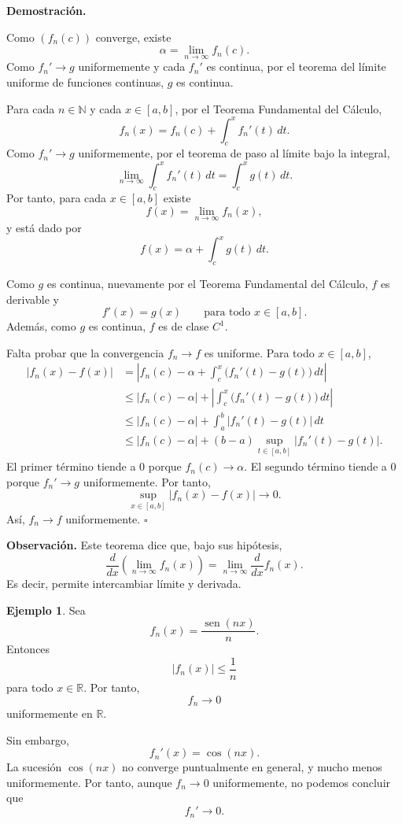 \documentclass[11pt,a4paper,openany]{book}
\theoremstyle{definition}
\newtheorem{ejemplo}{Ejemplo}[chapter]
\theoremstyle{plain}
\theoremstyle{remark}
\renewenvironment{proof}[1][\textbf{Demostración.}]{%
  \par\noindent #1\ \normalfont
}{\hfill$\square$\par\medskip}
\newenvironment{observacion}
{\par\medskip\noindent\textbf{Observación. }\normalfont}
{\par\medskip}
\newcommand{\R}{\mathbb{R}}
\newcommand{\N}{\mathbb{N}}
\DeclareMathOperator{\sen}{sen}
\begin{document}
\begin{proof}
Como $(f_n(c))$ converge, existe
\[
    \alpha=\lim_{n\to\infty} f_n(c).
\]
Como $f_n'\to g$ uniformemente y cada $f_n'$ es continua, por el teorema del
límite uniforme de funciones continuas, $g$ es continua.

Para cada $n\in\N$ y cada $x\in[a,b]$, por el Teorema Fundamental del Cálculo,
\[
    f_n(x)
    =
    f_n(c)
    +
    \int_c^x f_n'(t)\,dt.
\]
Como $f_n'\to g$ uniformemente, por el teorema de paso al límite bajo la
integral,
\[
    \lim_{n\to\infty}\int_c^x f_n'(t)\,dt
    =
    \int_c^x g(t)\,dt.
\]
Por tanto, para cada $x\in[a,b]$ existe
\[
    f(x)=\lim_{n\to\infty}f_n(x),
\]
y está dado por
\[
    f(x)
    =
    \alpha
    +
    \int_c^x g(t)\,dt.
\]

Como $g$ es continua, nuevamente por el Teorema Fundamental del Cálculo,
$f$ es derivable y
\[
    f'(x)=g(x)
    \qquad\text{para todo }x\in[a,b].
\]
Además, como $g$ es continua, $f$ es de clase $C^1$.

Falta probar que la convergencia $f_n\to f$ es uniforme. Para todo
$x\in[a,b]$,
\[
\begin{aligned}
    |f_n(x)-f(x)|
    &=
    \left|
    f_n(c)-\alpha
    +
    \int_c^x \bigl(f_n'(t)-g(t)\bigr)\,dt
    \right|\\
    &\leq
    |f_n(c)-\alpha|
    +
    \left|
    \int_c^x \bigl(f_n'(t)-g(t)\bigr)\,dt
    \right|\\
    &\leq
    |f_n(c)-\alpha|
    +
    \int_a^b |f_n'(t)-g(t)|\,dt\\
    &\leq
    |f_n(c)-\alpha|
    +
    (b-a)\sup_{t\in[a,b]}|f_n'(t)-g(t)|.
\end{aligned}
\]
El primer término tiende a $0$ porque $f_n(c)\to\alpha$. El segundo término
tiende a $0$ porque $f_n'\to g$ uniformemente. Por tanto,
\[
    \sup_{x\in[a,b]}|f_n(x)-f(x)|\to 0.
\]
Así, $f_n\to f$ uniformemente.
\end{proof}

\begin{observacion}
Este teorema dice que, bajo sus hipótesis,
\[
    \frac{d}{dx}\left(\lim_{n\to\infty}f_n(x)\right)
    =
    \lim_{n\to\infty}\frac{d}{dx}f_n(x).
\]
Es decir, permite intercambiar límite y derivada.
\end{observacion}

\begin{ejemplo}
Sea
\[
    f_n(x)=\frac{\sen(nx)}{n}.
\]
Entonces
\[
    |f_n(x)|\leq \frac1n
\]
para todo $x\in\R$. Por tanto,
\[
    f_n\to 0
\]
uniformemente en $\R$.

Sin embargo,
\[
    f_n'(x)=\cos(nx).
\]
La sucesión $\cos(nx)$ no converge puntualmente en general, y mucho menos
uniformemente. Por tanto, aunque $f_n\to 0$ uniformemente, no podemos concluir
que
\[
    f_n'\to 0.
\]
\end{ejemplo}
\end{document}
